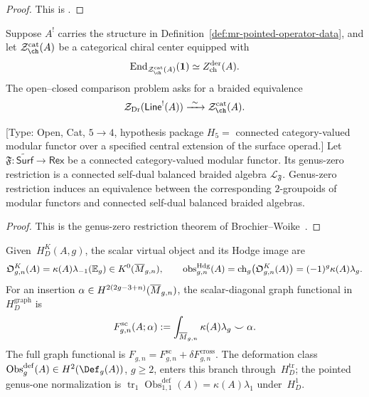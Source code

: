 \begin{proof}
This is \cite[Proposition~7.13.8 and \S7.14]{EGNO}.
\end{proof}

\begin{conjecture}
\label{conj:mr-chiral-drinfeld-comparison}
Suppose $A^!$ carries the structure in
Definition~\ref{def:mr-pointed-operator-data}, and let
$\mathcal Z_{\ch}^{\mathrm{cat}}(A)$ be a categorical chiral center
equipped with
\[
 \operatorname{End}_{\mathcal Z_{\ch}^{\mathrm{cat}}(A)}
 (\mathbf 1)\simeq\DerZch(A).
\]
The open--closed comparison problem asks for a braided equivalence
\[
 \mathcal Z_{\mathrm{Dr}}(\mathsf{Line}^{!}(A))
 \xrightarrow{\ \sim\ }
 \mathcal Z_{\ch}^{\mathrm{cat}}(A).
\]
\end{conjecture}

\begin{theorem}
\label{thm:mr-modular}
\textup{[Type: Open, Cat, $5\rightarrow4$, hypothesis package
$H_5=$ connected category-valued modular functor over a specified
central extension of the surface operad.]}
Let
$\mathfrak F\colon\widetilde{\mathsf{Surf}}\to\mathsf{Rex}$ be a
connected category-valued modular functor.  Its genus-zero
restriction is a connected self-dual balanced braided algebra
$\mathcal L_{\mathfrak F}$.  Genus-zero restriction induces an
equivalence between the corresponding $2$-groupoids of modular
functors and connected self-dual balanced braided algebras.
\end{theorem}

\begin{proof}
This is the genus-zero restriction theorem of
Brochier--Woike~\cite[Theorem~6.13]{BrochierWoike2022}.
\end{proof}

\begin{definition}
\label{def:mr-hodge-scalar-projection}
Given~$H_D^K(A,g)$, the scalar virtual object and its Hodge image are
\[
 \mathfrak O^K_{g,n}(A)
 =\kappa(A)\lambda_{-1}(\mathbb E_g)
 \in K^0(\overline{M}_{g,n}),
 \qquad
 \operatorname{obs}^{\mathrm{Hdg}}_{g,n}(A)
 =\operatorname{ch}_g\!\left(\mathfrak O^K_{g,n}(A)\right)
 =(-1)^g\kappa(A)\lambda_g.
\]
For an insertion
$\alpha\in H^{2(2g-3+n)}(\overline{M}_{g,n})$, the scalar-diagonal graph
functional in~$H_D^{\mathrm{graph}}$ is
\[
 F^{\mathrm{sc}}_{g,n}(A;\alpha)
 :=
 \int_{\overline{M}_{g,n}}\kappa(A)\lambda_g\smile\alpha.
\]
The full graph functional is
$F_{g,n}=F^{\mathrm{sc}}_{g,n}+\delta F^{\mathrm{cross}}_{g,n}$.
The deformation class
$\operatorname{Obs}^{\mathrm{def}}_g(A)\in H^2(\Def_g(A))$, $g\geq2$,
enters
this branch through~$H_D^{\mathrm{tr}}$; the pointed genus-one
normalization is
$\operatorname{tr}_1\operatorname{Obs}^{\mathrm{def}}_{1,1}(A)
=\kappa(A)\lambda_1$ under~$H_D^1$.
\end{definition}


